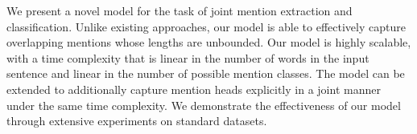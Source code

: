 We present a novel model for the task of joint mention extraction and classification. Unlike existing approaches, our model is able to effectively capture overlapping mentions whose lengths are unbounded. Our model is highly scalable, with a time complexity that is linear in the number of words in the input sentence and linear in the number of possible mention classes. The model can be extended to additionally capture mention heads explicitly in a joint manner under the same time complexity. We demonstrate the effectiveness of our model through extensive experiments on standard datasets.
